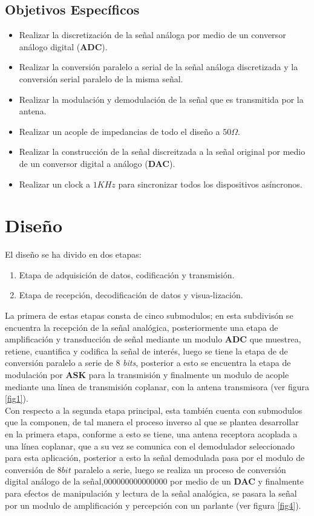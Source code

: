 \documentclass[10pt,graphicx,caption,rotating]{article}
\begin{document}
\subsection{Objetivos Específicos}
\begin{itemize}
 \item Realizar la discretización de la señal análoga por medio de un conversor análogo digital (\textbf{ADC}).
 \item Realizar la conversión paralelo a serial de la señal análoga discretizada y la conversión serial paralelo de la misma señal.
 \item Realizar la modulación y demodulación de la señal que es transmitida por la antena.
 \item Realizar un acople de impedancias de todo el diseño a $50\Omega$.
 \item Realizar la construcción de la señal discreitzada a la señal original por medio de un conversor digital a análogo (\textbf{DAC}).
 \item Realizar un clock a $1KHz$ para sincronizar todos los dispositivos asíncronos.
\end{itemize}

\section{Diseño}
\noindent
El diseño se ha divido en dos etapas:
\begin{enumerate}
 \item Etapa de adquisición de datos, codificación y transmisión.
 \item Etapa de recepción, decodificación de datos y visua-lización.
\end{enumerate}
\noindent
La primera de estas etapas consta de cinco submodulos;  en esta subdivisón se encuentra la recepción de la señal analógica, posteriormente una etapa de amplificación y transducción de señal mediante un modulo \textbf{ADC} que muestrea, retiene, cuantifica y codifica la señal de interés, luego se tiene la etapa de de conversión  paralelo a serie de $8$ \textit{bits}, posterior a esto se encuentra la etapa de modulación por \textbf{ASK} para la transmisión y finalmente un modulo de acople mediante una línea de transmisión coplanar, con la antena transmisora (ver figura \ref{fig1}).\\
Con respecto a la segunda etapa principal, esta también cuenta con submodulos que la componen, de tal manera el proceso inverso al que se plantea desarrollar en la primera etapa, conforme a esto se tiene, una antena receptora acoplada a una línea coplanar, que a su vez  se comunica con el demodulador  seleccionado para esta aplicación,  posterior a esto la señal  demodulada pasa por el modulo de conversión de $8 bit$ paralelo a serie, luego se realiza  un proceso de  conversión digital análogo  de la señal,000000000000000 por medio de un \textbf{DAC} y finalmente para efectos de manipulación y lectura de la señal analógica, se pasara la señal por un modulo de amplificación y percepción con un parlante (ver figura \ref{fig4}).
\end{document}
